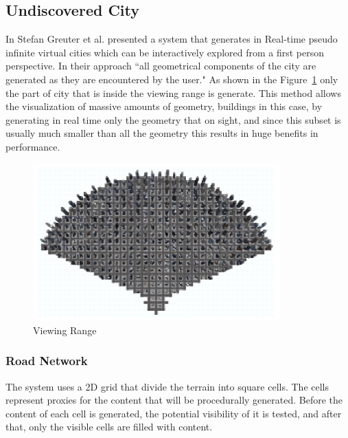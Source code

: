 
\subsection{Undiscovered City} %
\label{sub:undiscovered_city}

In \cite{Greuter2003} Stefan Greuter et al. presented a system that generates in Real-time pseudo infinite virtual cities which can be interactively explored from a first person perspective. In their approach ``all geometrical components of the city are generated as they are encountered by the user." As shown in the Figure~\ref{fig:viewingRange} only the part of city that is inside the viewing range is generate. This method allows the visualization of massive amounts of geometry, buildings in this case, by generating in real time only the geometry that on sight, and since this subset is usually much smaller than all the geometry this results in huge benefits in performance.

\begin{figure}[htbp]
	\centering
	\includegraphics[width=0.85\textwidth]{img/Real-Time-procedural-generation/viewing-range.png}
	\caption{Viewing Range}
	\label{fig:viewingRange}
\end{figure}

\subsubsection{Road Network} %
\label{ssub:road_network}

The system uses a 2D grid that divide the terrain into square cells. The cells represent proxies for the content that will be procedurally generated. Before the content of each cell is generated, the potential visibility of it is tested, and after that, only the visible cells are filled with content.

